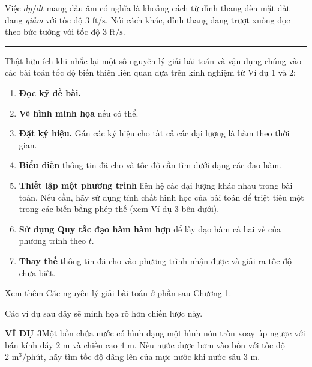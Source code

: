 \begin{minipage}[t]{0.71\textwidth}
  \noindent Việc $dy/dt$ mang dấu âm có nghĩa là khoảng cách từ đỉnh thang đến mặt đất đang \textit{giảm} với tốc độ $3\text{ ft/s}$. Nói cách khác, đỉnh thang đang trượt xuống dọc theo bức tường với tốc độ $3\text{ ft/s}$.\hfill\textcolor{stewartblue}{\rule{1.1ex}{1.1ex}}\par

  \vspace{10pt}

  \begin{tcolorbox}[
    colback=strategybg,
    colframe=strategypurple,
    coltitle=white,
    fonttitle=\bfseries\sffamily\normalsize,
    title={Chiến lược giải bài toán},
    arc=0mm,
    boxrule=1pt,
    left=8pt, right=8pt, top=6pt, bottom=6pt
  ]
    \small
    Thật hữu ích khi nhắc lại một số nguyên lý giải bài toán và vận dụng chúng vào các bài toán tốc độ biến thiên liên quan dựa trên kinh nghiệm từ Ví dụ 1 và 2:
    \begin{enumerate}[label=\textbf{\arabic*.}, leftmargin=1.5em, itemsep=3pt, topsep=4pt, parsep=0pt]
      \item \textbf{Đọc kỹ đề bài.}
      \item \textbf{Vẽ hình minh họa} nếu có thể.
      \item \textbf{Đặt ký hiệu.} Gán các ký hiệu cho tất cả các đại lượng là hàm theo thời gian.
      \item \textbf{Biểu diễn} thông tin đã cho và tốc độ cần tìm dưới dạng các đạo hàm.
      \item \textbf{Thiết lập một phương trình} liên hệ các đại lượng khác nhau trong bài toán. Nếu cần, hãy sử dụng tính chất hình học của bài toán để triệt tiêu một trong các biến bằng phép thế (xem Ví dụ 3 bên dưới).
      \item \textbf{Sử dụng Quy tắc đạo hàm hàm hợp} để lấy đạo hàm cả hai vế của phương trình theo $t$.
      \item \textbf{Thay thế} thông tin đã cho vào phương trình nhận được và giải ra tốc độ chưa biết.
    \end{enumerate}
    \vspace{4pt}
    {\footnotesize Xem thêm Các nguyên lý giải bài toán ở phần sau Chương 1.}
  \end{tcolorbox}

  \vspace{8pt}
  \noindent Các ví dụ sau đây sẽ minh họa rõ hơn chiến lược này.

  \vspace{10pt}
  \noindent\textbf{\textcolor{stewartblue}{VÍ DỤ 3}}\quad Một bồn chứa nước có hình dạng một hình nón tròn xoay úp ngược với bán kính đáy $2\text{ m}$ và chiều cao $4\text{ m}$. Nếu nước được bơm vào bồn với tốc độ $2\text{ m}^3\text{/phút}$, hãy tìm tốc độ dâng lên của mực nước khi nước sâu $3\text{ m}$.


\end{minipage}

